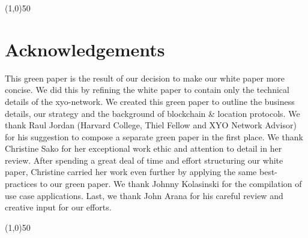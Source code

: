 \documentclass{article}
\begin{document}
\begin{center}
\line(1,0){50}
\end{center}

\section {Acknowledgements}
This green paper is the result of our decision to make our white paper more concise. We did this by refining the white paper to contain only the technical details of the \Gls{xyo-network}. We created this green paper to outline the business details, our strategy and the background of blockchain \& location protocols. We thank Raul Jordan (Harvard College, Thiel Fellow and XYO Network Advisor) for his suggestion to compose a separate green paper in the first place. We thank Christine Sako for her exceptional work ethic and attention to detail in her review. After spending a great deal of time and effort structuring our white paper, Christine carried her work even further by applying the same best-practices to our green paper. We thank Johnny Kolasinski for the compilation of use case applications. Last, we thank John Arana for his careful review and creative input for our efforts.


\begin{center}
\line(1,0){50}
\end{center}
\end{document}
